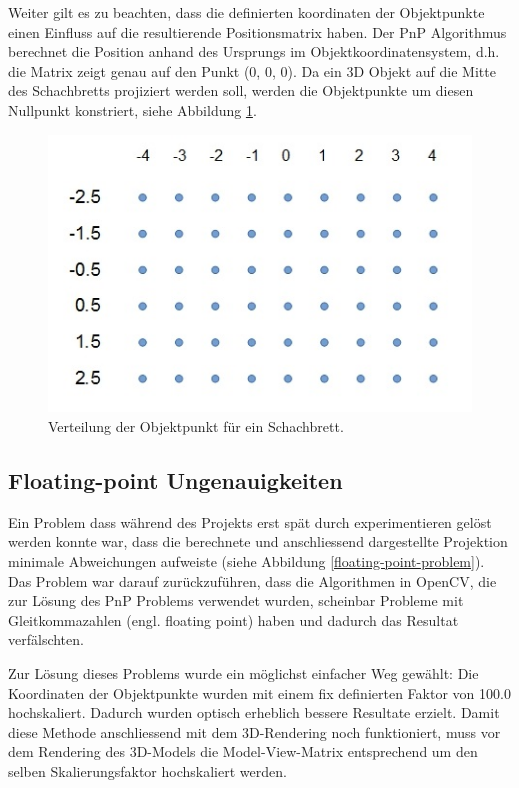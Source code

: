 Weiter gilt es zu beachten, dass die definierten koordinaten der Objektpunkte einen Einfluss auf die resultierende Positionsmatrix haben. Der PnP Algorithmus berechnet die Position anhand des Ursprungs im Objektkoordinatensystem, d.h. die Matrix zeigt genau auf den Punkt (0, 0, 0). 
Da ein 3D Objekt auf die Mitte des Schachbretts projiziert werden soll, werden die Objektpunkte um diesen Nullpunkt konstriert, siehe Abbildung \ref{fig:object-points}.

\begin{figure}[!ht]
\centering
\includegraphics[scale=0.8]{images/object-points.jpg} 
\caption{Verteilung der Objektpunkt für ein Schachbrett.}
\label{fig:object-points}
\end{figure}


\subsection{Floating-point Ungenauigkeiten}

Ein Problem dass während des Projekts erst spät durch experimentieren gelöst werden konnte war, dass die berechnete und anschliessend dargestellte Projektion minimale Abweichungen aufweiste (siehe Abbildung \ref{floating-point-problem}). Das Problem war darauf zurückzuführen, dass die Algorithmen in OpenCV, die zur Lösung des PnP Problems verwendet wurden, scheinbar Probleme mit Gleitkommazahlen (engl. floating point) haben und dadurch das Resultat verfälschten.

Zur Lösung dieses Problems wurde ein möglichst einfacher Weg gewählt: Die Koordinaten der Objektpunkte wurden mit einem fix definierten Faktor von 100.0 hochskaliert. Dadurch wurden optisch erheblich bessere Resultate erzielt. Damit diese Methode anschliessend mit dem 3D-Rendering noch funktioniert, muss vor dem Rendering des 3D-Models die Model-View-Matrix entsprechend um den selben Skalierungsfaktor hochskaliert werden.

